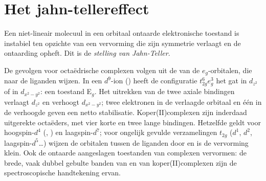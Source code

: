 \section{Het jahn-tellereffect}

\begin{theorem}\label{thm:b3:complex-spectra-magnetism:jahn-teller}
Een niet-lineair molecuul in een orbitaal ontaarde elektronische toestand
is instabiel ten opzichte van een vervorming die zijn symmetrie verlaagt
en de ontaarding opheft. Dit is de
\emph{stelling van Jahn-Teller}.
\end{theorem}

\admitted

De gevolgen voor octaëdrische complexen volgen uit de  van de
$e_g$-orbitalen, die naar de liganden wijzen. In een $d^9$-ion () heeft de configuratie
$t_{2g}^6e_g^3$ het gat in $d_{z^2}$ of in $d_{x^2-y^2}$: een toestand E$_g$. Het uitrekken van de twee axiale
bindingen verlaagt $d_{z^2}$ en verhoogt $d_{x^2-y^2}$; twee elektronen in de verlaagde orbitaal
en één in de verhoogde geven een netto stabilisatie. Koper(II)complexen
zijn inderdaad uitgerekte octaëders, met vier korte en twee lange
bindingen. Hetzelfde geldt
voor hoogspin-$d^4$ (, ) en laagspin-$d^7$; voor ongelijk gevulde verzamelingen $t_{2g}$
($d^1$, $d^2$, laagspin-$d^5$\dots) wijzen de orbitalen tussen de liganden door en is de
vervorming klein. Ook de ontaarde aangeslagen toestanden van complexen
vervormen: de
brede, vaak dubbel gebulte banden van  en van koper(II)complexen zijn
de spectroscopische handtekening ervan.

